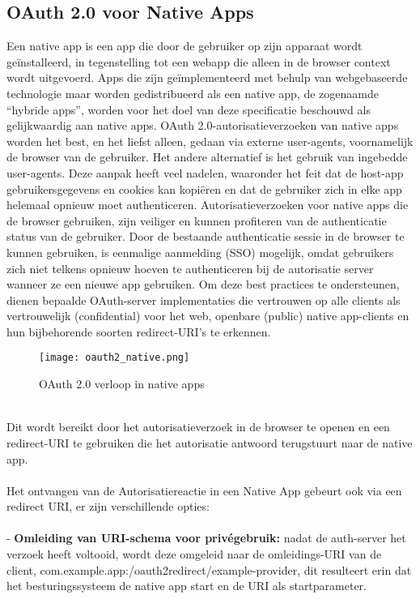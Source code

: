   \subsection{OAuth 2.0 voor Native Apps}%
  \label{subsec:oauth-2.0-voor-native-apps}
  Een native app is een app die door de gebruiker op zijn apparaat wordt geïnstalleerd, in tegenstelling tot een webapp die alleen in de browser context wordt uitgevoerd. Apps die zijn geïmplementeerd met behulp van webgebaseerde technologie maar worden gedistribueerd als een native app, de zogenaamde ``hybride apps'', worden voor het doel van deze specificatie beschouwd als gelijkwaardig aan native apps.\autocite{Denniss2017}
  OAuth 2.0-autorisatieverzoeken van native apps worden het best, en het liefst alleen, gedaan via externe user-agents, voornamelijk de browser van de gebruiker. Het andere alternatief is het gebruik van ingebedde user-agents. Deze aanpak heeft veel nadelen, waaronder het feit dat de host-app gebruikersgegevens en cookies kan kopiëren en dat de gebruiker zich in elke app helemaal opnieuw moet authenticeren. Autorisatieverzoeken voor native apps die de browser gebruiken, zijn veiliger en kunnen profiteren van de authenticatie status van de gebruiker. Door de bestaande authenticatie sessie in de browser te kunnen gebruiken, is eenmalige aanmelding (SSO) mogelijk, omdat gebruikers zich niet telkens opnieuw hoeven te authenticeren bij de autorisatie server wanneer ze een nieuwe app gebruiken.\autocite{Denniss2017}
  Om deze best practices te ondersteunen, dienen bepaalde OAuth-server implementaties die vertrouwen op alle clients als vertrouwelijk (confidential) voor het web, openbare (public) native app-clients en hun bijbehorende soorten redirect-URI's te erkennen.
  \begin{figure}[h]
    \centering
    \texttt{[image: oauth2\_native.png]}
    \caption{OAuth 2.0 verloop in native apps}
    \label{fig:example2}
  \end{figure}
  \\
  Dit wordt bereikt door het autorisatieverzoek in de browser te openen en een redirect-URI te gebruiken die het autorisatie antwoord terugstuurt naar de native app.
  \\
  \\
  Het ontvangen van de Autorisatiereactie in een Native App gebeurt ook via een redirect URI, er zijn verschillende opties:
  \\\\
  - \textbf{Omleiding van URI-schema voor privégebruik:} nadat de auth-server het verzoek heeft voltooid, wordt deze omgeleid naar de omleidings-URI van de client, com.example.app:/oauth2redirect/example-provider, dit resulteert erin dat het besturingssysteem de native app start en de URI als startparameter.

